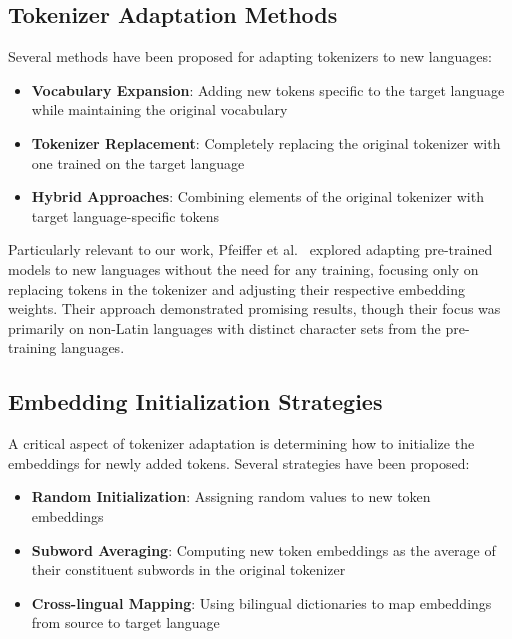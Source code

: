 \subsection{Tokenizer Adaptation Methods}
Several methods have been proposed for adapting tokenizers to new languages:

\begin{itemize}
    \item \textbf{Vocabulary Expansion}: Adding new tokens specific to the target language while maintaining the original vocabulary~\cite{wang2019extending}
    
    \item \textbf{Tokenizer Replacement}: Completely replacing the original tokenizer with one trained on the target language~\cite{rust2020good}
    
    \item \textbf{Hybrid Approaches}: Combining elements of the original tokenizer with target language-specific tokens~\cite{AdaptinigPretrainedModels}
\end{itemize}

Particularly relevant to our work, Pfeiffer et al.~\cite{AdaptinigPretrainedModels} explored adapting pre-trained models to new languages without the need for any training, focusing only on replacing tokens in the tokenizer and adjusting their respective embedding weights. Their approach demonstrated promising results, though their focus was primarily on non-Latin languages with distinct character sets from the pre-training languages.

\subsection{Embedding Initialization Strategies}
A critical aspect of tokenizer adaptation is determining how to initialize the embeddings for newly added tokens. Several strategies have been proposed:

\begin{itemize}
    \item \textbf{Random Initialization}: Assigning random values to new token embeddings~\cite{wang2019extending}
    
    \item \textbf{Subword Averaging}: Computing new token embeddings as the average of their constituent subwords in the original tokenizer~\cite{AdaptinigPretrainedModels}
    
    \item \textbf{Cross-lingual Mapping}: Using bilingual dictionaries to map embeddings from source to target language~\cite{artetxe2018robust}
\end{itemize}

